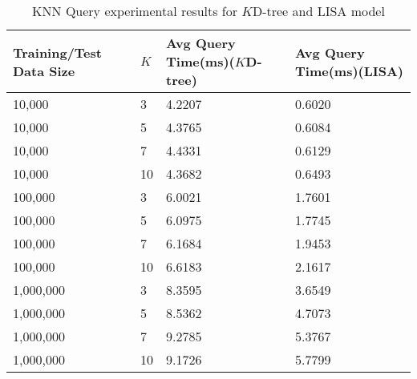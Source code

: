 \begin{table}
	\centering
\centering
	\begin{tabular}{||p{}<{\centering}|p{}<{\centering}|p{}<{\centering}|p{}<{\centering}||}
		\hline
		Training/Test Data Size& $K$ & Avg Query Time(ms)($K$D-tree) & Avg Query Time(ms)(LISA)\\ [0.5ex] 
		\hline
		\hline
	 	10,000& 3& 4.2207 &0.6020 \\
	 	\hline
	 	10,000& 5& 4.3765 &0.6084\\
	 	\hline
	 	10,000& 7& 4.4331 &0.6129 \\
	 	\hline
	 	10,000 & 10&4.3682 &0.6493 \\
	 	\hline
	 	100,000 & 3& 6.0021 &1.7601 \\
	 	\hline
	 	100,000 & 5& 6.0975 &1.7745 \\
	 	\hline
	 	100,000 & 7& 6.1684 &1.9453 \\
	 	\hline
	 	100,000 & 10& 6.6183 &2.1617 \\
	 	\hline
	    1,000,000 & 3& 8.3595 & 3.6549 \\
	 	\hline
	 	1,000,000 & 5& 8.5362 &4.7073 \\
	 	\hline
	 	1,000,000 & 7& 9.2785 &5.3767 \\
	 	\hline
	 	1,000,000 & 10& 9.1726 &5.7799 \\
		\hline
		\hline
	\end{tabular}
	\caption{KNN Query experimental results for $K$D-tree and LISA model}
	\label{KNN_Query_Experimental_Results}

\end{table}



